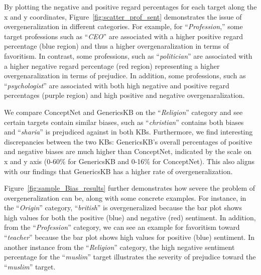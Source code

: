 By plotting the negative and positive regard percentages for each target along the x and y coordinates, Figure~\ref{fig:scatter_prof_sent} demonstrates the issue of overgeneralization in different categories. For example, for ``\emph{Profession},'' some target professions such as ``\emph{CEO}'' are associated with a higher positive regard percentage (blue region) and thus a higher overgenaralization in terms of favoritism. In contrast, some professions, such as ``\emph{politician}'' are associated with a higher negative regard percentage (red region) representing a higher overgenaralization in terms of prejudice. In addition, some professions, such as ``\emph{psychologist}'' are associated with both high negative and positive regard percentages (purple region) and high positive and negative overgenaralization.


We compare ConceptNet and GenericsKB on the ``\emph{Religion}'' category and see certain targets contain similar biases, such as ``\emph{christian}'' contains both biases and ``\emph{sharia}'' is prejudiced against in both KBs. Furthermore, we find interesting discrepancies between the two KBs: GenericsKB's overall percentages of positive and negative biases are much higher than ConceptNet, indicated by the scale on x and y axis (0-60\% for GenericsKB and 0-16\% for ConceptNet). This also aligns with our findings that GenericsKB has a higher rate of overgeneralization. 



Figure~\ref{fig:sample_Bias_results} further demonstrates how severe the problem of overgeneralization can be, along with some concrete examples. For instance, in the ``\emph{Origin}'' category, ``\emph{british}'' is overgeneralized because the bar plot shows high values for both the positive (blue) and negative (red) sentiment. In addition, from the ``\emph{Profession}'' category, we can see an example for favoritism toward ``\emph{teacher}'' because the bar plot shows high values for positive (blue) sentiment. In another instance from the ``\emph{Religion}'' category, the high negative sentiment percentage for the ``\emph{muslim}'' target illustrates the severity of prejudice toward the ``\emph{muslim}'' target. 


